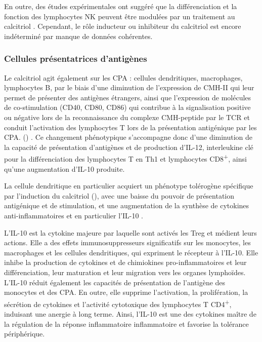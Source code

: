 \documentclass[
  a4paper,
  DIV=11,
  numbers=noendperiod,
  listof=totoc]{scrreprt}
\begin{document}
En outre, des études expérimentales ont suggéré que la différenciation
et la fonction des lymphocytes \ac{NK} peuvent être modulées par un
traitement au calcitriol \autocite{Charoenngam.2020}. Cependant, le rôle
inducteur ou inhibiteur du calcitriol est encore indéterminé par manque
de données cohérentes.

\subsubsection{Cellules présentatrices
d'antigènes}\label{cellules-pruxe9sentatrices-dantiguxe8nes}

Le calcitriol agit également sur les \ac{CPA} : cellules dendritiques,
macrophages, lymphocytes B, par le biais d'une diminution de
l'expression de \ac{CMH-II} qui leur permet de présenter des antigènes
étrangers, ainsi que l'expression de molécules de co-stimulation
(\ac{CD}40, \ac{CD}80, \ac{CD}86) qui contribue à la signalisation
positive ou négative lors de la reconnaissance du complexe CMH-peptide
par le \ac{TCR} et conduit l'activation des lymphocytes T lors de la
présentation antigénique par les \ac{CPA}. ()
\autocite{Charoenngam.2020,Meza-Meza.2022,Caprio.2017}. Ce changement
phénotypique s'accompagne donc d'une diminution de la capacité de
présentation d'antigènes et de production d'\ac{IL-12}, interleukine clé
pour la différenciation des lymphocytes T en Th1 et lymphocytes
CD8\textsuperscript{+}, ainsi qu'une augmentation d'\ac{IL-10} produite.

La cellule dendritique en particulier acquiert un phénotype tolérogène
spécifique par l'induction du calcitriol (), avec
une baisse du pouvoir de présentation antigénique et de stimulation, et
une augmentation de la synthèse de cytokines anti-inflammatoires et en
particulier l'\ac{IL}-10 \autocite{Bishop.2021}.

L'\ac{IL}-10 est la cytokine majeure par laquelle sont activés les
\ac{Treg} et médient leurs actions. Elle a des effets immunosuppresseurs
significatifs sur les monocytes, les macrophages et les cellules
dendritiques, qui expriment le récepteur à l'\ac{IL}-10. Elle inhibe la
production de cytokines et de chimiokines pro-inflammatoires et leur
différenciation, leur maturation et leur migration vers les organes
lymphoïdes. L'\ac{IL}-10 réduit également les capacités de présentation
de l'antigène des monocytes et des \ac{CPA}. En outre, elle supprime
l'activation, la prolifération, la sécrétion de cytokines et l'activité
cytotoxique des lymphocytes T \ac{CD}4\textsuperscript{+}, induisant une
anergie à long terme. Ainsi, l'\ac{IL}-10 est une des cytokines maître
de la régulation de la réponse inflammatoire inflammatoire et favorise
la tolérance périphérique.
\end{document}
